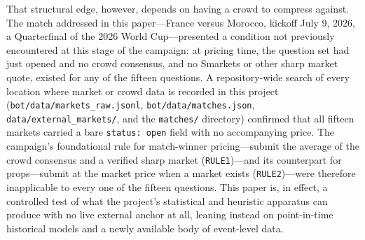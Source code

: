 \documentclass[11pt]{article}
\begin{document}
That structural edge, however, depends on having a crowd to compress against. The match
addressed in this paper---France versus Morocco, kickoff July 9, 2026, a Quarterfinal of
the 2026 World Cup---presented a condition not previously encountered at this stage of the
campaign: at pricing time, the question set had just opened and no crowd consensus, and no
Smarkets or other sharp market quote, existed for any of the fifteen questions. A
repository-wide search of every location where market or crowd data is recorded in this
project (\texttt{bot/data/markets\_raw.jsonl}, \texttt{bot/data/matches.json},
\texttt{data/external\_markets/}, and the \texttt{matches/} directory) confirmed that all
fifteen markets carried a bare \texttt{status: open} field with no accompanying price. The
campaign's foundational rule for match-winner pricing---submit the average of the crowd
consensus and a verified sharp market (\texttt{RULE1})---and its counterpart for
props---submit at the market price when a market exists (\texttt{RULE2})---were therefore
inapplicable to every one of the fifteen questions. This paper is, in effect, a controlled
test of what the project's statistical and heuristic apparatus can produce with no live
external anchor at all, leaning instead on point-in-time historical models and a newly
available body of event-level data.
\end{document}
